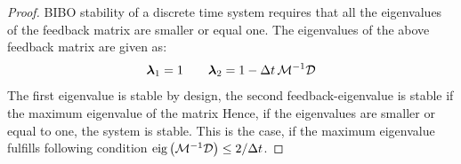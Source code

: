\begin{proof}

BIBO stability of a discrete time system requires that all the eigenvalues of the feedback matrix are smaller or equal one.
The eigenvalues of the above feedback matrix are given as:
\begin{equation}
	\boldsymbol{\lambda}_1 = 1 \qquad \boldsymbol{\lambda}_2 = 1 - \Delta t \, \mathcal{M}^{-1} \mathcal{D}
\end{equation}
The first eigenvalue is stable by design, the second feedback-eigenvalue is stable if the maximum eigenvalue of the matrix 
Hence, if the eigenvalues are smaller or equal to one, the system is stable. This is the case, if the maximum eigenvalue fulfills following condition $\text{eig} \left( \mathcal{M}^{-1} \mathcal{D} \right) \leq 2 / \Delta t$.
\end{proof}

